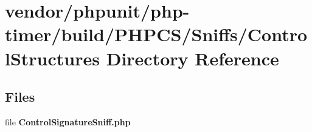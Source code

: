 \section{vendor/phpunit/php-\/timer/build/\+P\+H\+P\+C\+S/\+Sniffs/\+Control\+Structures Directory Reference}
\label{dir_0c2971779ff5595d16977a9a6b075721}
\subsection*{Files}
\begin{DoxyCompactItemize}
\item 
file {\bf Control\+Signature\+Sniff.\+php}
\end{DoxyCompactItemize}
